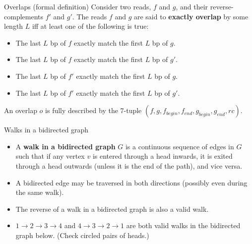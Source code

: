 \documentclass[xcolor=dvipsnames]{beamer}
\newcommand{\LengthVar}{L}
\begin{document}
\begin{frame}{Overlaps (formal definition)}
    Consider two reads, $f$ and $g$, and their reverse-complements $f'$ and $g'$.
    The reads $f$ and $g$ are said to {\bf exactly overlap} by some length
    $\LengthVar$ iff at least one of the following is true:
    \begin{itemize}
        \item The last $\LengthVar$ bp of $f$ exactly match the first
        $\LengthVar$ bp of $g$.
        \item The last $\LengthVar$ bp of $f$ exactly match the first
        $\LengthVar$ bp of $g'$.
        \item The last $\LengthVar$ bp of $f'$ exactly match the first
        $\LengthVar$ bp of $g$.
        \item The last $\LengthVar$ bp of $f'$ exactly match the first
        $\LengthVar$ bp of $g'$.
    \end{itemize}
    An overlap $o$ is fully described by the 7-tuple $(f, g, f_{begin}, f_{end},
    g_{begin}, g_{end}, rc)$.
\end{frame}

\begin{frame}{Walks in a bidirected graph}
    \begin{itemize}
        \item A {\bf walk in a bidirected graph} $G$ is a continuous sequence of
        edges in $G$ such that if any vertex $v$ is entered through a head
        inwards, it is exited through a head outwards (unless it is the end of the
        path), and vice versa.
        \item A bidirected edge may be traversed in both directions
        (possibly even during the same walk).
        \item The reverse of a walk in a bidirected graph is also a
        valid walk.
        \item $1 \to 2 \to 3 \to 4$ and $4 \to 3 \to 2 \to 1$ are both valid
        walks in the bidirected graph below.  (Check circled pairs of
        heads.)
    \end{itemize}
        \begin{center} {\small
         } \end{center}
\end{frame}
\end{document}
